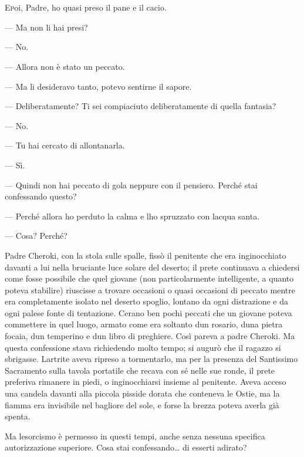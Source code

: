 	\chapter{\phantom{text}}

\lettrine{E} poi, Padre, ho quasi preso il pane e il cacio.

--- Ma non li hai presi?

--- No.

--- Allora non è stato un peccato.

--- Ma li desideravo tanto, potevo sentirne il sapore.

--- Deliberatamente? Ti sei compiaciuto deliberatamente di quella
fantasia?

--- No.

--- Tu hai cercato di allontanarla.

--- Sì.

--- Quindi non hai peccato di gola neppure con il pensiero. Perché stai
confessando questo?

--- Perché allora ho perduto la calma e l\textquotesingle ho spruzzato
con l\textquotesingle acqua santa.

--- Cosa? Perché?

Padre Cheroki, con la stola sulle spalle, fissò il penitente che era
inginocchiato davanti a lui nella bruciante luce solare del deserto; il
prete continuava a chiedersi come fosse possibile che quel giovane (non
particolarmente intelligente, a quanto poteva stabilire) riuscisse a
trovare occasioni o quasi occasioni di peccato mentre era completamente
isolato nel deserto spoglio, lontano da ogni distrazione e da ogni
palese fonte di tentazione. C\textquotesingle erano ben pochi peccati
che un giovane poteva commettere in quel luogo, armato come era soltanto
d\textquotesingle un rosario, d\textquotesingle una pietra focaia,
d\textquotesingle un temperino e d\textquotesingle un libro di
preghiere. Così pareva a padre Cheroki. Ma questa confessione stava
richiedendo molto tempo; si augurò che il ragazzo si sbrigasse.
L\textquotesingle artrite aveva ripreso a tormentarlo, ma per la
presenza del Santissimo Sacramento sulla tavola portatile che recava con
sé nelle sue ronde, il prete preferiva rimanere in piedi, o
inginocchiarsi insieme al penitente. Aveva acceso una candela davanti
alla piccola pisside dorata che conteneva le Ostie, ma la fiamma era
invisibile nel bagliore del sole, e forse la brezza poteva averla già
spenta.

Ma l\textquotesingle esorcismo è permesso in questi tempi, anche senza
nessuna specifica autorizzazione superiore. Cosa stai
confessando\ldots{} di esserti adirato?

